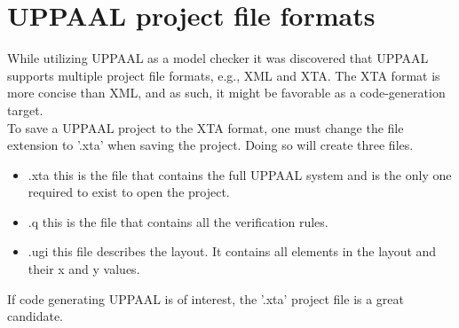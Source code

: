 \section{UPPAAL project file formats}

While utilizing UPPAAL as a model checker it was discovered that UPPAAL supports multiple project file formats, e.g., XML and XTA. The XTA format is more concise than XML, and as such, it might be favorable as a code-generation target. \\
To save a UPPAAL project to the XTA format, one must change the file extension to '.xta' when saving the project. Doing so will create three files.

\begin{itemize}
    \item .xta this is the file that contains the full UPPAAL system and is the only one required to exist to open the project.
    \item .q this is the file that contains all the verification rules.
    \item .ugi this file describes the layout. It contains all elements in the layout and their x and y values.
\end{itemize}

If code generating UPPAAL is of interest, the '.xta' project file is a great candidate.
